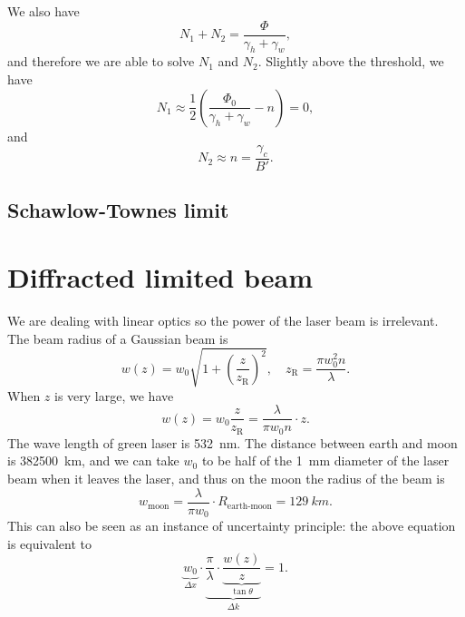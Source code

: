 \documentclass[hyperref, a4paper]{article}
\begin{document}
We also have 
\begin{equation}
    N_1 + N_2 = \frac{\Phi}{\gamma_h + \gamma_w},
\end{equation}
and therefore we are able to solve $N_1$ and $N_2$.
Slightly above the threshold, we have 
\begin{equation}
    N_1 \approx \frac{1}{2} \left(
        \frac{\Phi_0}{\gamma_h + \gamma_w} - n
    \right) = 0,
\end{equation}
and 
\begin{equation}
    N_2 \approx n = \frac{\gamma_c}{B'}.
\end{equation}

\subsection{Schawlow-Townes limit}

\section{Diffracted limited beam}

We are dealing with linear optics 
so the power of the laser beam is irrelevant.
The beam radius of a Gaussian beam is 
\begin{equation}
    w(z) = w_0 \sqrt{1 + \left(\frac{z}{z_{\text{R}}}\right)^2}, \quad 
    z_{\text{R}} = \frac{\pi w_0^2 n}{\lambda}.
\end{equation}
When $z$ is very large, we have 
\begin{equation}
    w(z) = w_0 \frac{z}{z_{\text{R}}} = \frac{\lambda}{\pi w_0 n} \cdot z.
\end{equation}
The wave length of green laser is \SI{532}{nm}.
The distance between earth and moon is \SI{382500}{km},
and we can take $w_0$ to be half of the \SI{1}{mm} diameter of the laser beam 
when it leaves the laser,
and thus on the moon the radius of the beam is 
\[
    w_{\text{moon}} = \frac{\lambda}{\pi w_0} \cdot R_{\text{earth-moon}} = 
    \SI{129}{km}.
\]
This can also be seen as an instance of uncertainty principle: 
the above equation is equivalent to 
\begin{equation}
    \underbrace{w_0}_{\Delta x} \cdot 
    \underbrace{\frac{\pi}{\lambda} \cdot \underbrace{\frac{w(z)}{z}}_{\tan \theta}}_{\Delta k} = 1.
\end{equation}
\end{document}
